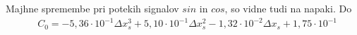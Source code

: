 Majhne spremembe pri potekih signalov $sin$ in $cos$, so vidne tudi na napaki. Do  
\begin{eqnarray}
&C_0 =-5,36\cdot 10^{-1}\Delta x_s^{3}+5,10\cdot 10^{-1}\Delta x_s^{2}-1,32\cdot 10^{-2}\Delta x_s+1,75\cdot 10^{-1} \\

\end{eqnarray}































































